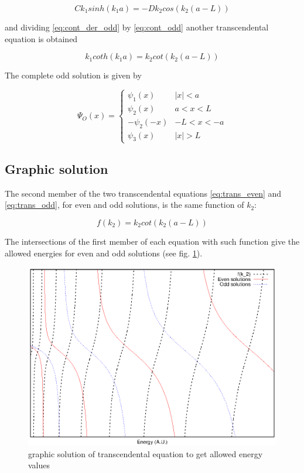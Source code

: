\documentclass{article}
\begin{document}
\begin{equation}
\label{eq:cont_der_odd}
C k_{1} sinh(k_{1}a) =  - D k_{2} cos(k_{2}(a-L))
\end{equation}

and dividing \eqref{eq:cont_der_odd} by \eqref{eq:cont_odd} another transcendental equation is obtained

\begin{equation}
\label{eq:trans_odd}
k_{1} coth(k_{1}a) = k_{2} cot(k_{2}(a-L))
\end{equation}

The complete odd solution is given by

\begin{equation}
\Psi_{O}(x) = 
  \begin{cases} 
      \psi_{1}(x) & \left|x\right| < a \\
      \psi_{2}(x) & a < x < L \\
      -\psi_{2}(-x) & -L < x < -a \\
      \psi_{3}(x) & \left|x\right| > L
   \end{cases}
\end{equation}

\subsection{Graphic solution}
The second member of the two transcendental equations \eqref{eq:trans_even} and \eqref{eq:trans_odd}, for even and odd solutions, is the same function of \(k_{2}\):

\begin{equation}
f(k_{2}) = k_{2}cot(k_{2}(a-L))
\end{equation}

The intersections of the first member of each equation with such function give the allowed energies for even and odd solutions (see fig. \ref{graph_sol_ex_1_3}).

\begin{figure}
\centering
\includegraphics{graph_sol_ex_1_3.eps}
\caption{graphic solution of transcendental equation to get allowed energy values}
\label{graph_sol_ex_1_3}
\end{figure}
\end{document}
